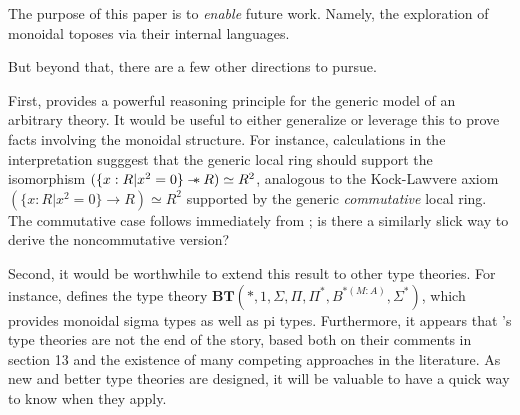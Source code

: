 \documentclass{article}
\newcommand*{\wand}{\mathbin{-\mkern-6mu*}}
\begin{document}
The purpose of this paper is to \emph{enable} future work.
Namely, the exploration of monoidal toposes via their internal languages.

But beyond that, there are a few other directions to pursue.

First, \cite{blechschmidt} provides a powerful reasoning principle for the generic model of an arbitrary theory.
It would be useful to either generalize or leverage this to prove facts involving the monoidal structure.
For instance, calculations in the interpretation sugggest that the generic local ring should support
the isomorphism \((\{x : R | x^2 = 0\} \wand R) \simeq R^2\),
analogous to the Kock-Lawvere axiom \((\{x : R | x^2 = 0\} \to R) \simeq R^2\)
supported by the generic \emph{commutative} local ring.
The commutative case follows immediately from \cite[Theorem 4.10]{blechschmidt};
is there a similarly slick way to derive the noncommutative version?

Second, it would be worthwhile to extend this result to other type theories.
For instance, \cite{schopp} defines the type theory
\(\mathbf{BT}(*, 1, \Sigma, \Pi, \Pi^*, B^{*(M:A)}, \Sigma^*)\),
which provides monoidal sigma types as well as pi types.
Furthermore, it appears that \cite{schopp}'s type theories are not the end of the story,
based both on their comments in section 13 and the existence of many competing approaches in the literature.
As new and better type theories are designed, it will be valuable to have a quick way to know when they apply.

\printbibliography
\end{document}

